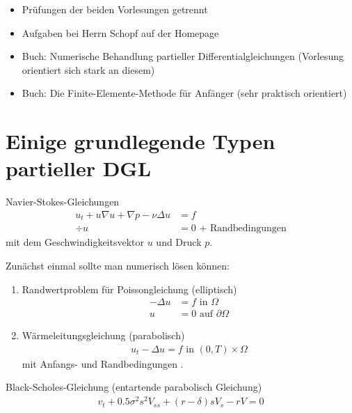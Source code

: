 \setcounter{page}{1}
\begin{itemize}
\item Prüfungen der beiden Vorlesungen getrennt
\item Aufgaben bei Herrn Schopf auf der Homepage
\item Buch: Numerische Behandlung partieller Differentialgleichungen (Vorlesung orientiert sich stark an diesem)
\item Buch: Die Finite-Elemente-Methode für Anfänger (sehr praktisch orientiert)
\end{itemize}
\section{Einige grundlegende Typen partieller DGL}
\begin{beispiel} Navier-Stokes-Gleichungen
  \begin{align*}
    u_t + u \nabla u + \nabla p - \nu \Delta u &= f \\
    \div u &= 0 \text{ + Randbedingungen}
  \end{align*}
  mit dem Geschwindigkeitsvektor $u$ und Druck $p$.
\end{beispiel}
Zunächst einmal sollte man numerisch lösen können:
\begin{enumerate}
\item Randwertproblem für Poissongleichung (elliptisch)
  \begin{align*}
    - \Delta u &= f \text{ in $\Omega$}\\
    u &= 0 \text{ auf } \partial \Omega
  \end{align*}
\item Wärmeleitungsgleichung (parabolisch)
  \begin{align*}
    u_t - \Delta u = f \text{ in $(0,T) \times \Omega$}
  \end{align*}
mit Anfangs- und Randbedingungen .
\end{enumerate}
\begin{beispiel} Black-Scholes-Gleichung (entartende parabolisch Gleichung)
  \begin{align*}
    v_t + 0.5 \sigma^2 s^2 V_{ss} + (r - \delta)s V_s -r V = 0
  \end{align*}
  
\end{beispiel}

